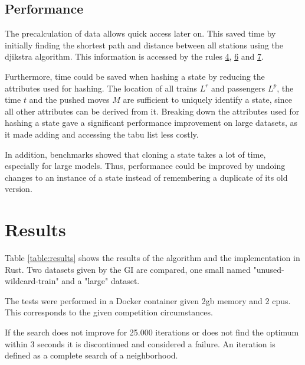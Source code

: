 \documentclass[a4paper,12pt,parskip]{article}
\begin{document}
\subsection{Performance}

The precalculation of data allows quick access later on. This saved time by initially
finding the shortest path and distance between all stations using the djikstra 
algorithm. This information is accessed by the rules \hyperref[rule:4]{4}, 
\hyperref[rule:6]{6} and \hyperref[rule:7]{7}.

Furthermore, time could be saved when hashing a state by reducing the attributes 
used for hashing. The location of all trains $L^r$ and passengers $L^p$, the time 
$t$ and the pushed moves $M$ are sufficient to uniquely identify a state, since 
all other attributes can be derived from it. Breaking down the attributes used 
for hashing a state gave a significant performance improvement on large datasets, 
as it made adding and accessing the tabu list less costly.

In addition, benchmarks showed that cloning a state takes a lot of time, especially 
for large models. Thus, performance could be improved by undoing changes to an 
instance of a state instead of remembering a duplicate of its old version.

\section{Results}

Table \ref{table:results} shows the results of the algorithm and the 
implementation in Rust. Two datasets given by the GI are compared, one small 
named "unused-wildcard-train" and a "large" dataset. 

The tests were performed in a Docker container given 2gb memory and 2 cpus. This 
corresponds to the given competition circumstances.

If the search does not improve for 25.000 iterations or does not find the optimum 
within $3$ seconds it is discontinued and considered a failure. An iteration 
is defined as a complete search of a neighborhood.
\end{document}
